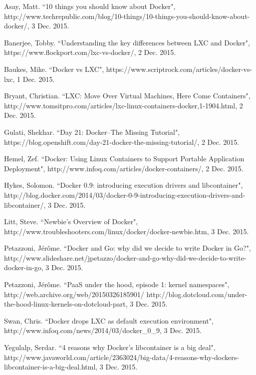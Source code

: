 \documentclass[letterpaper,twocolumn,10pt]{article}
\begin{document}
\begin{thebibliography}{1}

\bibitem{}
Asay, Matt. ``10 things you should know about Docker", http://www.techrepublic.com/blog/10-things/10-things-you-should-know-about-docker/, 3 Dec. 2015.

\bibitem{}
Banerjee, Tobby. ``Understanding the key differences between LXC and Docker", https://www.flockport.com/lxc-vs-docker/, 2 Dec. 2015.

\bibitem{}
Baukes, Mike. ``Docker vs LXC", https://www.scriptrock.com/articles/docker-vs-lxc, 1 Dec. 2015.

\bibitem{}
Bryant, Christian. ``LXC: Move Over Virtual Machines, Here Come Containers", http://www.tomsitpro.com/articles/lxc-linux-containers-docker,1-1904.html, 2 Dec. 2015.

\bibitem{}
Gulati, Shekhar. ``Day 21: Docker–The Missing Tutorial", https://blog.openshift.com/day-21-docker-the-missing-tutorial/, 2 Dec. 2015.

\bibitem{}
Hemel, Zef. ``Docker: Using Linux Containers to Support Portable Application Deployment", http://www.infoq.com/articles/docker-containers/, 2 Dec. 2015.

\bibitem{}
Hykes, Solomon. ``Docker 0.9: introducing execution drivers and libcontainer", http://blog.docker.com/2014/03/docker-0-9-introducing-execution-drivers-and-libcontainer/, 3 Dec. 2015.

\bibitem{}
Litt, Steve. ``Newbie's Overview of Docker", http://www.troubleshooters.com/linux/docker/docker-newbie.htm, 3 Dec. 2015.

\bibitem{}
Petazzoni, Jérôme. ``Docker and Go: why did we decide to write Docker in Go?", http://www.slideshare.net/jpetazzo/docker-and-go-why-did-we-decide-to-write-docker-in-go, 3 Dec. 2015.

\bibitem{}
Petazzoni, Jérôme. ``PaaS under the hood, episode 1: kernel namespaces", http://web.archive.org/web/20150326185901/ http://blog.dotcloud.com/under-the-hood-linux-kernels-on-dotcloud-part, 3 Dec. 2015.

\bibitem{}
Swan, Chris. ``Docker drops LXC as default execution environment", http://www.infoq.com/news/2014/03/docker\_0\_9, 3 Dec. 2015.

\bibitem{}
Yegulalp, Serdar. ``4 reasons why Docker's libcontainer is a big deal", http://www.javaworld.com/article/2363024/big-data/4-reasons-why-dockers-libcontainer-is-a-big-deal.html, 3 Dec. 2015.


\end{thebibliography}
\end{document}
